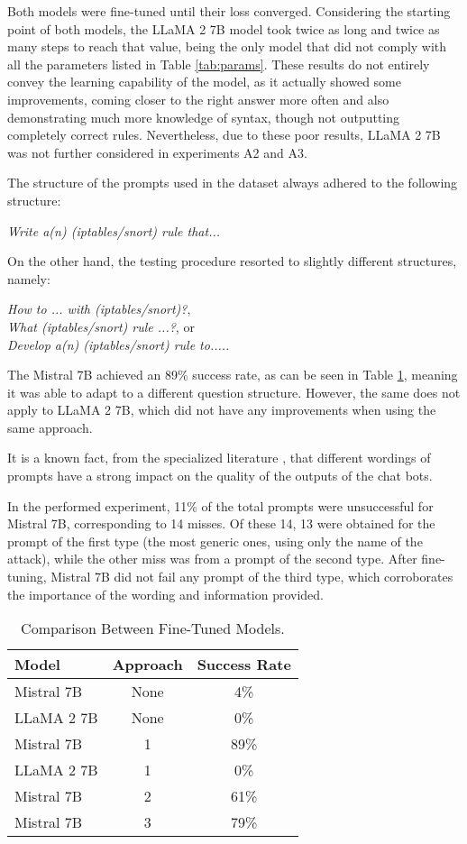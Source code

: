 \documentclass[sigconf]{acmart}
\begin{document}
Both models were fine-tuned until their loss converged. Considering the starting point of both models, the LLaMA 2 7B model took twice as long and twice as many steps to reach that value, being the only model that did not comply with all the parameters listed in Table \ref{tab:params}. These results do not entirely convey the learning capability of the model, as it actually showed some improvements, coming closer to the right answer more often and also demonstrating much more knowledge of syntax, though not outputting completely correct rules. Nevertheless, due to these poor results, LLaMA 2 7B was not further considered in experiments A2 and A3.

The structure of the prompts used in the dataset always adhered to the following structure:
\begin{center}
\textit{Write a(n) (iptables/snort) rule that...}
\end{center}
On the other hand, the testing procedure resorted to slightly different structures, namely:
\begin{center}
\textit{How to ... with (iptables/snort)?}, \\
\textit{What (iptables/snort) rule ...?}, or \\
\textit{Develop a(n) (iptables/snort) rule to.....}
\end{center}
The Mistral 7B achieved an 89\% success rate, as can be seen in Table \ref{tab:finetuned-compare}, meaning it was able to adapt to a different question structure. However, the same does not apply to LLaMA 2 7B, which did not have any improvements when using the same approach. 

It is a known fact, from the specialized literature \cite{Temara23}, that different wordings of prompts have a strong impact on the quality of the outputs of the chat bots. 

In the performed experiment, 11\% of the total prompts were unsuccessful for Mistral 7B, corresponding to 14 misses. Of these 14, 13 were obtained for the prompt of the first type (the most generic ones, using only the name of the attack), while the other miss was from a prompt of the second type. After fine-tuning, Mistral 7B did not fail any prompt of the third type, which corroborates the importance of the wording and information provided.

\begin{table}[h]
  \caption{Comparison Between Fine-Tuned Models.}
  \label{tab:finetuned-compare}
  \begin{tabular}{@{}lcc@{}}
    \toprule
    \textbf{Model} & \textbf{Approach} & \textbf{Success Rate} \\
    \midrule
    Mistral 7B & None & 4\% \\
    LLaMA 2 7B & None & 0\% \\
    Mistral 7B & 1 & 89\% \\
    LLaMA 2 7B & 1 & 0\% \\
    Mistral 7B & 2 & 61\% \\
    Mistral 7B & 3 & 79\% \\
    \bottomrule
  \end{tabular}
\end{table}
\end{document}
